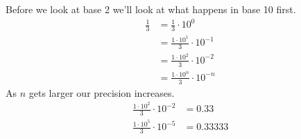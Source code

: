 \documentclass{article}
\begin{document}
\begin{flushleft}
Before we look at base 2 we'll look at what happens in base 10 first.
\begin{align}
    \frac{1}{3} &= \frac{1}{3} \cdot 10^{0}\\
                &= \frac{1 \cdot 10^1}{3} \cdot 10^{-1}\\
                &= \frac{1 \cdot 10^2}{3} \cdot 10^{-2}\\
                &= \frac{1 \cdot 10^n}{3} \cdot 10^{-n}
\end{align}
As $n$ gets larger our precision increases.
\begin{align}
    \frac{1 \cdot 10^2}{3} \cdot 10^{-2} &= 0.33\\
    \frac{1 \cdot 10^5}{3} \cdot 10^{-5} &= 0.33333
\end{align}
\end{flushleft}
\end{document}
